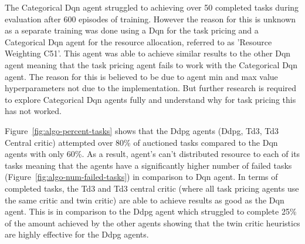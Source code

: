 The Categorical Dqn agent struggled to achieving over 50 completed tasks during evaluation after 600 episodes of
training. However the reason for this is unknown as a separate training was done using a Dqn for the task pricing and
a Categorical Dqn agent for the resource allocation, referred to as 'Resource Weighting C51'. This agent was able to
achieve similar results to the other Dqn agent meaning that the task pricing agent fails to work with the Categorical
Dqn agent. The reason for this is believed to be due to agent min and max value hyperparameters not due to the
implementation. But further research is required to explore Categorical Dqn agents fully and understand
why for task pricing this has not worked.

Figure~\ref{fig:algo-percent-tasks} shows that the Ddpg agents (Ddpg, Td3, Td3 Central critic) attempted over 80\% of
auctioned tasks compared to the Dqn agents with only 60\%. As a result, agent's can't distributed resource to
each of its tasks meaning that the agents have a significantly higher number of failed tasks
(Figure~\ref{fig:algo-num-failed-tasks}) in comparison to Dqn agent. In terms of completed tasks, the Td3 and Td3
central critic (where all task pricing agents use the same critic and twin critic) are able to achieve results as good
as the Dqn agent. This is in comparison to the Ddpg agent which struggled to complete 25\% of the amount achieved by
the other agents showing that the twin critic heuristics are highly effective for the Ddpg agents.



